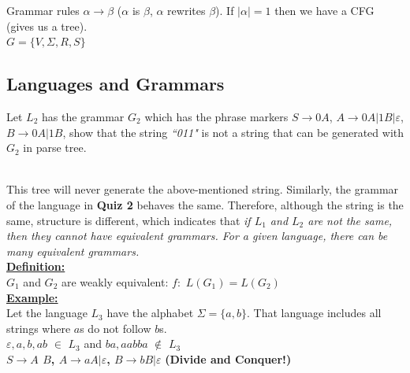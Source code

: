 \documentclass[12pt,a4paper]{article}
\begin{document}
Grammar rules $\alpha\rightarrow\beta$ ($\alpha$ is $\beta$, $\alpha$ rewrites $\beta$). If $|\alpha|=1$ then we have a CFG (gives us a tree).\\

\textbf{$G=\lbrace V,\Sigma,R,S\rbrace$}

\subsection{Languages and Grammars}
Let $L_{2}$ has the grammar $G_{2}$ which has the phrase markers $S\rightarrow0A$, $A\rightarrow0A|1B|\varepsilon$, $B\rightarrow0A|1B$, show that the string \emph{``011"} is not a string that can be generated with $G_{2}$ in parse tree.\\

\\

\noindent This tree will never generate the above-mentioned string. Similarly, the grammar of the language in \textbf{Quiz 2} behaves the same. Therefore, although the string is the same, structure is different, which indicates that \emph{if $L_{1}$ and $L_{2}$ are not the same, then they cannot have equivalent grammars. For a given language, there can be many equivalent grammars.}\\

\underline{\textbf{Definition:}}\\
$G_{1}$ and $G_{2}$ are weakly equivalent: $f:$ $L(G_{1})=L(G_{2})$\\

\noindent \underline{\textbf{Example:}}\\
Let the language $L_{3}$ have the alphabet $\Sigma= \lbrace a,b \rbrace$. That language includes all strings where $a$s do not follow $b$s.\\

$\varepsilon,a,b,ab$ $\in$ $L_{3}$ and $ba,aabba$ $\notin$ $L_{3}$\\

\textbf{$S \rightarrow A$ $B$, $A \rightarrow aA|\varepsilon$, $B\rightarrow bB|\varepsilon$} \textbf{(Divide and Conquer!)}\\
\end{document}
